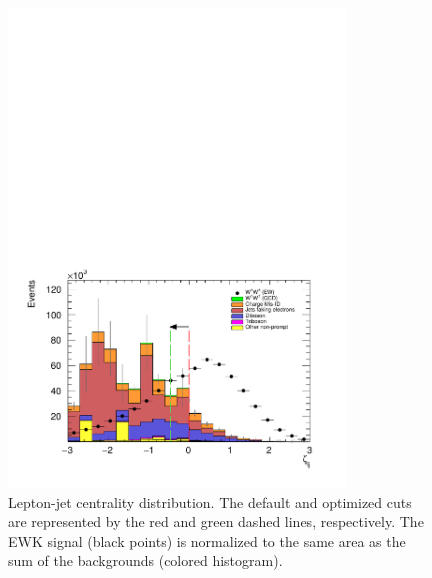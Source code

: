 \begin{figure}[htp]
  \centering
  \includegraphics[width=0.8\textwidth]{figs/ssww_upgrade/optimization_plots/centrality}
  \caption{Lepton-jet centrality distribution.  The default and optimized cuts are represented by the red and green dashed lines, respectively.  The \ssww EWK signal (black points) is normalized to the same area as the sum of the backgrounds (colored histogram).}
  \label{fig:optimized_centrality}
\end{figure}

